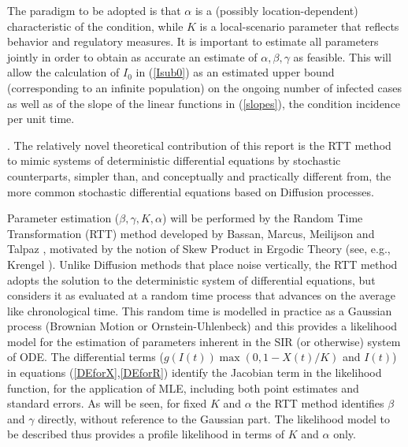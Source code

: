 \documentclass{article}
\begin{document}
The paradigm to be adopted is that $\alpha$ is a (possibly location-dependent) characteristic of the condition, while $K$ is a local-scenario parameter that reflects behavior and regulatory measures. It is important to estimate all parameters jointly in order to obtain as accurate an estimate of $\alpha, \beta, \gamma$ as feasible. This will allow the calculation of $I_0$ in (\ref{Isub0}) as an estimated upper bound (corresponding to an infinite population) on the ongoing number of infected cases as well as of the slope of the linear functions in (\ref{slopes}), the condition incidence per unit time.

\bigskip

. The relatively novel theoretical contribution of this report is the RTT method to mimic systems of deterministic differential equations by stochastic counterparts, simpler than, and conceptually and practically different from, the more common stochastic differential equations based on Diffusion processes.

Parameter estimation ($\beta, \gamma, K, \alpha$) will be performed by the Random Time Transformation (RTT) method developed by Bassan, Marcus, Meilijson and Talpaz \cite{Bassanetal}, motivated by the notion of Skew Product in Ergodic Theory (see, e.g., Krengel \cite{Krengel}). Unlike Diffusion methods that place noise vertically, the RTT method adopts the solution to the deterministic system of differential equations, but considers it as evaluated at a random time process that advances on the average like chronological time. This random time is modelled in practice as a Gaussian process (Brownian Motion or Ornstein-Uhlenbeck) and this provides a likelihood model for the estimation of parameters inherent in the SIR (or otherwise) system of ODE. The differential terms ($g(I(t)) \max(0,1 - X(t)/K)$ and $I(t)$) in equations (\ref{DEforX},\ref{DEforR}) identify the Jacobian term in the likelihood function, for the application of MLE, including both point estimates and standard errors. As will be seen, for fixed $K$ and $\alpha$ the RTT method identifies $\beta$ and $\gamma$ directly, without reference to the Gaussian part. The likelihood model to be described thus provides a profile likelihood in terms of $K$ and $\alpha$ only.

\bigskip
\end{document}
